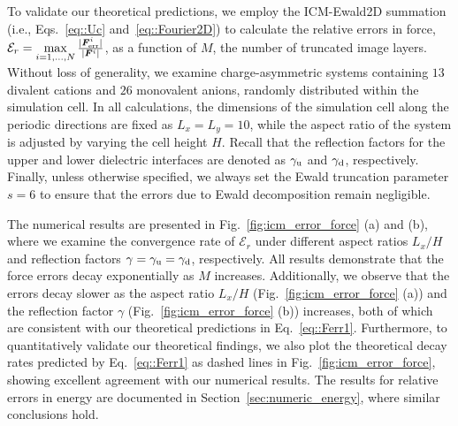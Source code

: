 To validate our theoretical predictions, we employ the ICM-Ewald2D summation (i.e., Eqs.~\eqref{eq::Uc} and~\eqref{eq::Fourier2D}) to calculate the relative errors in force, $\mathcal{E}_r = \max\limits_{i=1,\ldots,N}\frac{\lvert\bm{F}^i_{\text{err}}\rvert}{\lvert\bm{F}^i\rvert}$, as a function of $M$, the number of truncated image layers.
Without loss of generality, we examine charge-asymmetric systems containing $13$ divalent cations and $26$ monovalent anions, randomly distributed within the simulation cell. 
In all calculations, the dimensions of the simulation cell along the periodic directions are fixed as $L_x = L_y = 10$, while the aspect ratio of the system is adjusted by varying the cell height $H$. 
Recall that the reflection factors for the upper and lower dielectric interfaces are denoted as $\gamma_{\text{u}}$ and $\gamma_{\text{d}}$, respectively. 
Finally, unless otherwise specified, we always set the Ewald truncation parameter $s=6$ to ensure that the errors due to Ewald decomposition remain negligible. 



The numerical results are presented in Fig.~\ref{fig:icm_error_force} (a) and (b), where we examine the convergence rate of $\mathcal{E}_r$ under different aspect ratios $L_x / H$ and reflection factors $\gamma=\gamma_{\text{u}}=\gamma_{\text{d}}$, respectively.
All results demonstrate that the force errors decay exponentially as $M$ increases. 
Additionally, we observe that the errors decay slower as the aspect ratio $L_x / H$ (Fig.~\ref{fig:icm_error_force} (a)) and the reflection factor $\gamma$ (Fig.~\ref{fig:icm_error_force} (b)) increases, both of which are consistent with our theoretical predictions in Eq.~\eqref{eq::Ferr1}. 
Furthermore, to quantitatively validate our theoretical findings, we also plot the theoretical decay rates predicted by Eq.~\eqref{eq::Ferr1} as dashed lines in Fig.~\ref{fig:icm_error_force}, showing excellent agreement with our numerical results.
The results for relative errors in energy are documented in Section~\ref{sec:numeric_energy}, where similar conclusions hold.  


